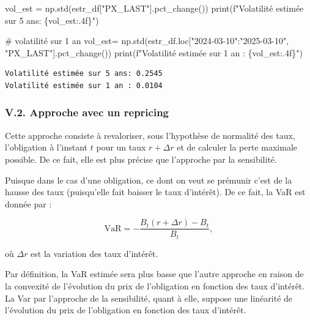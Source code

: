 \documentclass[
  letterpaper,
  DIV=11,
  numbers=noendperiod]{scrartcl}
\newenvironment{Shaded}{\begin{snugshade}}{\end{snugshade}}
\newcommand{\BuiltInTok}[1]{\textcolor[rgb]{0.00,0.23,0.31}{#1}}
\newcommand{\CommentTok}[1]{\textcolor[rgb]{0.37,0.37,0.37}{#1}}
\newcommand{\NormalTok}[1]{\textcolor[rgb]{0.00,0.23,0.31}{#1}}
\newcommand{\OperatorTok}[1]{\textcolor[rgb]{0.37,0.37,0.37}{#1}}
\newcommand{\SpecialCharTok}[1]{\textcolor[rgb]{0.37,0.37,0.37}{#1}}
\newcommand{\SpecialStringTok}[1]{\textcolor[rgb]{0.13,0.47,0.30}{#1}}
\newcommand{\StringTok}[1]{\textcolor[rgb]{0.13,0.47,0.30}{#1}}
\begin{document}
\begin{Shaded}
\begin{Highlighting}[]
\NormalTok{vol\_est }\OperatorTok{=}\NormalTok{ np.std(estr\_df[}\StringTok{"PX\_LAST"}\NormalTok{].pct\_change())}
\BuiltInTok{print}\NormalTok{(}\SpecialStringTok{f"Volatilité estimée sur 5 ans: }\SpecialCharTok{\{}\NormalTok{vol\_est}\SpecialCharTok{:.4f\}}\SpecialStringTok{"}\NormalTok{)}

\CommentTok{\# volatilité sur 1 an}
\NormalTok{vol\_est}\OperatorTok{=}\NormalTok{ np.std(estr\_df.loc[}\StringTok{"2024{-}03{-}10"}\NormalTok{:}\StringTok{"2025{-}03{-}10"}\NormalTok{, }\StringTok{"PX\_LAST"}\NormalTok{].pct\_change())}
\BuiltInTok{print}\NormalTok{(}\SpecialStringTok{f"Volatilité estimée sur 1 an : }\SpecialCharTok{\{}\NormalTok{vol\_est}\SpecialCharTok{:.4f\}}\SpecialStringTok{"}\NormalTok{)}
\end{Highlighting}
\end{Shaded}

\begin{verbatim}
Volatilité estimée sur 5 ans: 0.2545
Volatilité estimée sur 1 an : 0.0104
\end{verbatim}

\subsubsection{V.2. Approche avec un
repricing}\label{v.2.-approche-avec-un-repricing}

Cette approche consiste à revaloriser, sous l'hypothèse de normalité des
taux, l'obligation à l'instant \(t\) pour un taux \(r + \Delta r\) et de
calculer la perte maximale possible. De ce fait, elle est plus précise
que l'approche par la sensibilité.

Puisque dans le cas d'une obligation, ce dont on veut se prémunir c'est
de la hausse des taux (puisqu'elle fait baisser le taux d'intérêt). De
ce fait, la VaR est donnée par :

\[
\text{VaR} =  - \frac{B_t(r + \Delta r) - B_t }{B_t},
\]

où \(\Delta r\) est la variation des taux d'intérêt.

Par définition, la VaR estimée sera plus basse que l'autre approche en
raison de la convexité de l'évolution du prix de l'obligation en
fonction des taux d'intérêt. La Var par l'approche de la sensibilité,
quant à elle, suppose une linéarité de l'évolution du prix de
l'obligation en fonction des taux d'intérêt.
\end{document}
